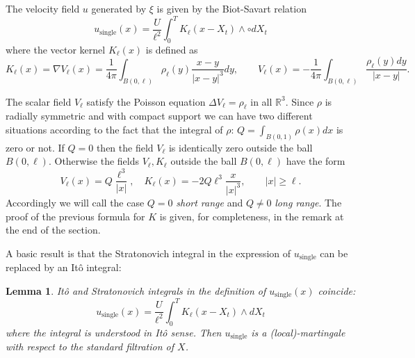 \documentclass[a4paper,12pt]{article}
\newtheorem{lemma}{Lemma}
\begin{document}
%
%
%
%
%
%
%
%

The velocity field $u$ generated by $\xi$ is given by the Biot-Savart
relation
\begin{equation}
u_{\text{single}}(x)=\frac{U}{\ell^{2}}\int_{0}^{T}K_{\ell}(x-X_{t}%
)\wedge\circ dX_{t}%
\end{equation}
where the vector kernel $K_{\ell}(x)$ is defined as
\begin{equation}
K_{\ell}(x)=\nabla V_{\ell}(x)=\frac{1}{4\pi}\int_{B(0,\ell)}\rho_{\ell
}(y)\frac{x-y}{|x-y|^{3}}dy,\qquad V_{\ell}(x)=-\frac{1}{4\pi}\int_{B(0,\ell
)}\frac{\rho_{\ell}(y)dy}{|x-y|}.
\end{equation}

The scalar field $V_{\ell}$ satisfy the Poisson equation $\Delta V_{\ell}%
=\rho_{\ell}$ in all $\mathbb{R}^{3}$. Since $\rho$ is radially symmetric and
with compact support we can have two different situations according to the
fact that the integral of $\rho$: $Q=\int_{B(0,1)}\rho(x)dx$ is zero or not.
If $Q=0$ then the field $V_{\ell}$ is identically zero outside the ball
$B(0,\ell)$. Otherwise the fields $V_{\ell},K_{\ell}$ outside the ball
$B(0,\ell)$ have the form
\begin{equation}
V_{\ell}(x)=Q\frac{\ell^{3}}{|x|},\quad K_{\ell}(x)=-2Q\ell^{3}\frac
{x}{|x|^{3}},\qquad\text{$|x|\geq\ell$}. \label{VKscal}%
\end{equation}
Accordingly we will call the case $Q=0$ \emph{short range} and $Q\neq0$
\emph{long range}. The proof of the previous formula for $K$ is given, for
completeness, in the remark at the end of the section.

A basic result is that the Stratonovich integral in the expression of
$u_{\text{single}}$ can be replaced by an It\^{o} integral:

\begin{lemma}
\label{eq:strato-ito} It\^{o} and Stratonovich integrals in the definition of
$u_{\text{single}}(x)$ coincide:
\begin{equation}
u_{\text{single}}(x)=\frac{U}{\ell^{2}}\int_{0}^{T}K_{\ell}(x-X_{t})\wedge
dX_{t}\label{eq:single-vortex-u-ito}%
\end{equation}
where the integral is understood in It\^{o} sense. Then $u_{\text{single}}$ is
a (local)-martingale with respect to the standard filtration of $X$.
\end{lemma}
\end{document}
